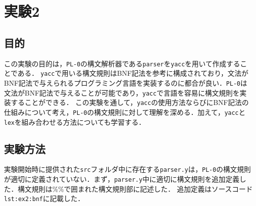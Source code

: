 \documentclass[uplatex]{jsarticle}
\begin{document}
\section{実験2}
\subsection{目的}
この実験の目的は，\verb#PL-0#の構文解析器である\verb#parser#を\verb#yacc#を用いて作成することである．
\verb#yacc#で用いる構文規則はBNF記法を参考に構成されており，文法がBNF記法で与えられるプログラミング言語を実装するのに都合が良い．\verb#PL-0#は文法がBNF記法で与えることが可能であり，\verb#yacc#で言語を容易に構文規則を実装することができる．
この実験を通して，\verb#yacc#の使用方法ならびにBNF記法の仕組みについて考え，\verb#PL-0#の構文規則に対して理解を深める．加えて，\verb#yacc#と\verb#lex#を組み合わせる方法についても学習する．
\subsection{実験方法}
実験開始時に提供された\verb#src#フォルダ中に存在する\verb#parser.y#は，\verb#PL-0#の構文規則が適切に定義されていない．まず，\verb#parser.y#中に適切に構文規則を追加定義した．構文規則は\%\%で囲まれた構文規則部に記述した．
追加定義はソースコード\verb#lst:ex2:bnf#に記載した．
\end{document}
